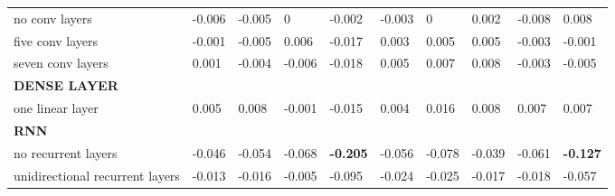 \begin{tabular}{llllllllll}
no conv layers                  & -0.006         & -0.005         & 0               & -0.002          & -0.003          & 0               & 0.002           & -0.008          & 0.008           \\
five conv layers                & -0.001         & -0.005         & 0.006           & -0.017          & 0.003           & 0.005           & 0.005           & -0.003          & -0.001          \\
seven conv layers               & 0.001          & -0.004         & -0.006          & -0.018          & 0.005           & 0.007           & 0.008           & -0.003          & -0.005          \\
\textbf{DENSE LAYER}            &                &                &                 &                 &                 &                 &                 &                 &                 \\
one linear layer                & 0.005          & 0.008          & -0.001          & -0.015          & 0.004           & 0.016           & 0.008           & 0.007           & 0.007           \\
\textbf{RNN}                    &                &                &                 & \textbf{}       &                 &                 &                 &                 & \textbf{}       \\
no recurrent layers             & -0.046         & -0.054         & -0.068          & \textbf{-0.205} & -0.056          & -0.078          & -0.039          & -0.061          & \textbf{-0.127} \\
unidirectional recurrent layers & -0.013         & -0.016         & -0.005          & -0.095          & -0.024          & -0.025          & -0.017          & -0.018          & -0.057         
\end{tabular}

